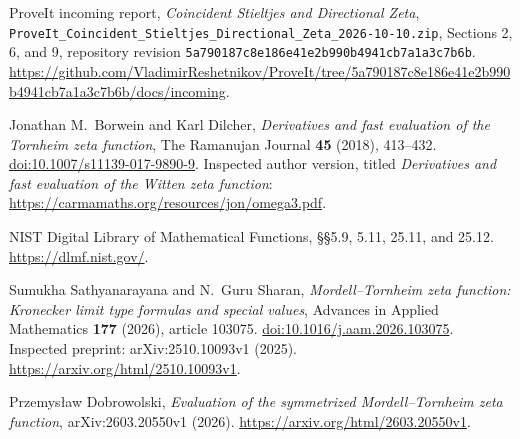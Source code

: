 ProveIt incoming report,
\emph{Coincident Stieltjes and Directional Zeta},
\texttt{ProveIt\_Coincident\_Stieltjes\_Directional\_Zeta\_2026-10-10.zip},
Sections 2, 6, and 9,
repository revision \texttt{5a790187c8e186e41e2b990b4941cb7a1a3c7b6b}.
\url{https://github.com/VladimirReshetnikov/ProveIt/tree/5a790187c8e186e41e2b990b4941cb7a1a3c7b6b/docs/incoming}.

Jonathan M.~Borwein and Karl Dilcher,
\emph{Derivatives and fast evaluation of the Tornheim zeta function},
The Ramanujan Journal \textbf{45} (2018), 413--432.
\href{https://doi.org/10.1007/s11139-017-9890-9}{doi:10.1007/s11139-017-9890-9}.
Inspected author version, titled
\emph{Derivatives and fast evaluation of the Witten zeta function}:
\url{https://carmamaths.org/resources/jon/omega3.pdf}.

NIST Digital Library of Mathematical Functions,
\S\S5.9, 5.11, 25.11, and 25.12.
\url{https://dlmf.nist.gov/}.

Sumukha Sathyanarayana and N.~Guru Sharan,
\emph{Mordell--Tornheim zeta function: Kronecker limit type formulas
and special values}, Advances in Applied Mathematics
\textbf{177} (2026), article 103075.
\href{https://doi.org/10.1016/j.aam.2026.103075}{doi:10.1016/j.aam.2026.103075}.
Inspected preprint: arXiv:2510.10093v1 (2025).
\url{https://arxiv.org/html/2510.10093v1}.

Przemys\l aw Dobrowolski,
\emph{Evaluation of the symmetrized Mordell--Tornheim zeta function},
arXiv:2603.20550v1 (2026).
\url{https://arxiv.org/html/2603.20550v1}.

